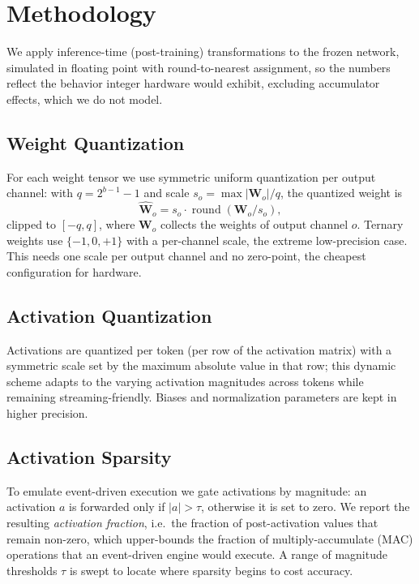 ﻿\documentclass[conference]{IEEEtran}
\begin{document}
\section{Methodology}\label{sec:method}
We apply inference-time (post-training) transformations to the frozen
network, simulated in floating point with round-to-nearest assignment, so
the numbers reflect the behavior integer hardware would exhibit,
excluding accumulator effects, which we do not model.

\subsection{Weight Quantization}
For each weight tensor we use symmetric uniform quantization per output
channel: with $q=2^{b-1}-1$ and scale $s_o=\max|\mathbf{W}_o|/q$, the
quantized weight is\begin{equation}
\hat{\mathbf{W}}_o = s_o \cdot
\operatorname{round}\!\left(\mathbf{W}_o / s_o\right),
\end{equation}clipped to $[-q,q]$, where $\mathbf{W}_o$ collects the weights of output
channel $o$. Ternary weights use $\{-1,0,+1\}$ with a per-channel scale,
the extreme low-precision case. This needs one scale per output channel
and no zero-point, the cheapest configuration for hardware.
\subsection{Activation Quantization}
Activations are quantized per token (per row of the activation matrix)
with a symmetric scale set by the maximum absolute value in that row; this
dynamic scheme adapts to the varying activation magnitudes across tokens
while remaining streaming-friendly. Biases and normalization parameters
are kept in higher precision.
\subsection{Activation Sparsity}
To emulate event-driven execution we gate activations by magnitude: an
activation $a$ is forwarded only if $|a|>\tau$, otherwise it is set to
zero. We report the resulting \emph{activation fraction}, i.e.\ the
fraction of post-activation values that remain non-zero, which upper-bounds
the fraction of multiply-accumulate (MAC) operations that an event-driven
engine would execute. A range of magnitude thresholds $\tau$ is swept to
locate where sparsity begins to cost accuracy.
\end{document}
